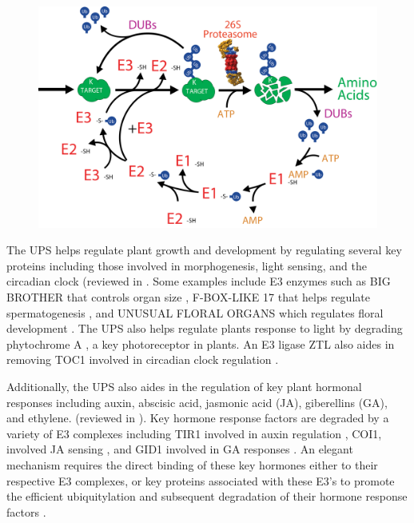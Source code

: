 \begin{figure}
	\centering
	\includegraphics[width=\columnwidth]{intro/upscycle.png}
	\label{fig:upscycle}
\end{figure}

	The UPS helps regulate plant growth and development by regulating several key proteins including those involved in morphogenesis, light sensing, and the circadian clock (reviewed in \citep{vierstra09}. Some examples include E3 enzymes such as BIG BROTHER that controls organ size \citep{disch06}, F-BOX-LIKE 17 that helps regulate spermatogenesis \citep{kim08}, and UNUSUAL FLORAL ORGANS which regulates floral development \citep{samach99}. The UPS also helps regulate plants response to light by degrading phytochrome A \citep{clough97, shanklin87}, a key photoreceptor in plants. An E3 ligase ZTL also aides in removing TOC1 involved in circadian clock regulation \citep{más03}. 

	Additionally, the UPS also aides in the regulation of key plant hormonal responses including auxin, abscisic acid, jasmonic acid (JA), giberellins (GA), and ethylene. (reviewed in \citep{santner10}). Key hormone response factors are degraded by a variety of E3 complexes including TIR1 involved in auxin regulation \citep{dharmasiri05}, COI1, involved JA sensing \citep{katsir08}, and GID1 involved in GA responses \citep{murase08}. An elegant mechanism requires the direct binding of these key hormones either to their respective E3 complexes, or key proteins associated with these E3's to promote the efficient ubiquitylation and subsequent degradation of their hormone response factors \citep{shabek14}. 

